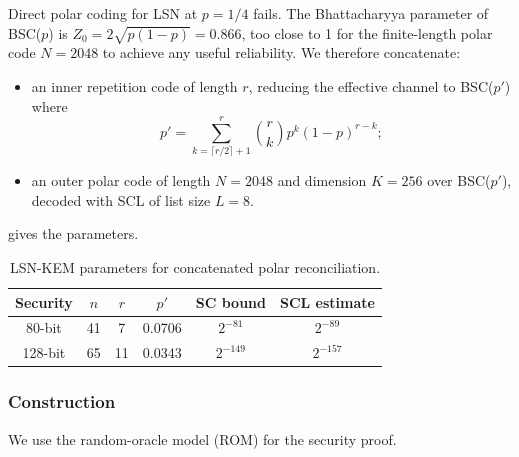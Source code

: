 \documentclass[11pt,a4paper]{article}
\theoremstyle{plain}
\theoremstyle{definition}
\begin{document}
Direct polar coding for LSN at $p=1/4$ fails. The Bhattacharyya parameter of BSC($p$) is $Z_0 = 2\sqrt{p(1-p)} = 0.866$, too close to 1 for the finite-length polar code $N=2048$ to achieve any useful reliability. We therefore concatenate:
\begin{itemize}
\item an inner repetition code of length $r$, reducing the effective channel to BSC($p'$) where
  \[
  p' = \sum_{k=\lceil r/2 \rceil + 1}^{r} \binom{r}{k} p^k (1-p)^{r-k};
  \]
\item an outer polar code of length $N=2048$ and dimension $K=256$ over BSC($p'$), decoded with SCL of list size $L=8$.
\end{itemize}

 gives the parameters.

\begin{table}[ht]
\centering
\caption{LSN-KEM parameters for concatenated polar reconciliation.}
\label{tab:kem-params}
\begin{tabular}{@{}cccccc@{}}
\hline
Security & $n$ & $r$ & $p'$ & SC bound & SCL estimate \\
\hline
80-bit  & 41 & 7  & 0.0706 & $2^{-81}$ & $2^{-89}$ \\
128-bit & 65 & 11 & 0.0343 & $2^{-149}$ & $2^{-157}$ \\
\hline
\end{tabular}
\end{table}

\subsubsection{Construction}
\label{subsubsec:kem-construction}

We use the random-oracle model (ROM) for the security proof.
\end{document}
